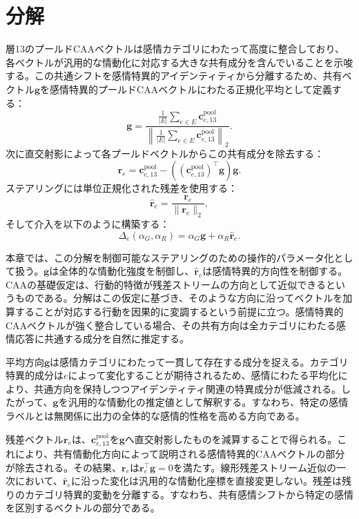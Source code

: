 \section{分解}
\label{sec:decomposition}

層13のプールドCAAベクトルは感情カテゴリにわたって高度に整合しており、各ベクトルが汎用的な情動化に対応する大きな共有成分を含んでいることを示唆する。この共通シフトを感情特異的アイデンティティから分離するため、共有ベクトル$\mathbf{g}$を感情特異的プールドCAAベクトルにわたる正規化平均として定義する：
\[
\mathbf{g}=
\frac{\frac{1}{|E|}\sum_{e\in E}\mathbf{c}^{\mathrm{pool}}_{e,13}}
{\left\lVert\frac{1}{|E|}\sum_{e\in E}\mathbf{c}^{\mathrm{pool}}_{e,13}\right\rVert_2}.
\]
次に直交射影によって各プールドベクトルからこの共有成分を除去する：
\[
\mathbf{r}_e=\mathbf{c}^{\mathrm{pool}}_{e,13}-\left((\mathbf{c}^{\mathrm{pool}}_{e,13})^\top \mathbf{g}\right)\mathbf{g}.
\]
ステアリングには単位正規化された残差を使用する：
\[
\hat{\mathbf{r}}_e=\frac{\mathbf{r}_e}{\lVert\mathbf{r}_e\rVert_2},
\]
そして介入を以下のように構築する：
\[
\Delta_e(\alpha_G,\alpha_R)=\alpha_G\mathbf{g}+\alpha_R\hat{\mathbf{r}}_e.
\]

本章では、この分解を制御可能なステアリングのための操作的パラメータ化として扱う。$\mathbf{g}$は全体的な情動化強度を制御し、$\hat{\mathbf{r}}_e$は感情特異的方向性を制御する。
CAAの基礎仮定は、行動的特徴が残差ストリームの方向として近似できるというものである。分解はこの仮定に基づき、そのような方向に沿ってベクトルを加算することが対応する行動を因果的に変調するという前提に立つ。感情特異的CAAベクトルが強く整合している場合、その共有方向は全カテゴリにわたる感情応答に共通する成分を自然に推定する。\par

平均方向$\mathbf{g}$は感情カテゴリにわたって一貫して存在する成分を捉える。カテゴリ特異的成分は$e$によって変化することが期待されるため、感情にわたる平均化により、共通方向を保持しつつアイデンティティ関連の特異成分が低減される。したがって、$\mathbf{g}$を汎用的な情動化の推定値として解釈する。すなわち、特定の感情ラベルとは無関係に出力の全体的な感情的性格を高める方向である。\par

残差ベクトル\(\mathbf{r}_e\)は、\(\mathbf{c}^{\mathrm{pool}}_{e,13}\)を\(\mathbf{g}\)へ直交射影したものを減算することで得られる。これにより、共有情動化方向によって説明される感情特異的CAAベクトルの部分が除去される。その結果、\(\mathbf{r}_e\)は\(\mathbf{r}_e^\top \mathbf{g}=0\)を満たす。線形残差ストリーム近似の一次において、\(\hat{\mathbf{r}}_e\)に沿った変化は汎用的な情動化座標を直接変更しない。残差は残りのカテゴリ特異的変動を分離する。すなわち、共有感情シフトから特定の感情を区別するベクトルの部分である。\par

